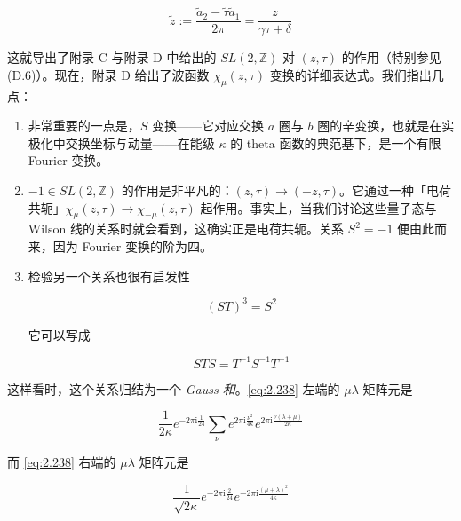 \begin{equation}
  \tilde z:=\frac{\tilde a_2-\tilde\tau\tilde a_1}{2\pi}=\frac{z}{\gamma\tau+\delta}
  \tag{2.236}
  \label{eq:2.236}
\end{equation}

这就导出了附录 C 与附录 D 中给出的 $SL(2,\mathbb{Z})$ 对 $(z,\tau)$ 的作用（特别参见 (D.6)）。现在，附录 D 给出了波函数 $\chi_\mu(z,\tau)$ 变换的详细表达式。我们指出几点：

\begin{enumerate}
  \item 非常重要的一点是，$S$ 变换——它对应交换 $a$ 圈与 $b$ 圈的辛变换，也就是在实极化中交换坐标与动量——在能级 $\kappa$ 的 theta 函数的典范基下，是一个有限 Fourier 变换。

  \item $-1\in SL(2,\mathbb{Z})$ 的作用是非平凡的：$(z,\tau)\to(-z,\tau)$。它通过一种「电荷共轭」$\chi_\mu(z,\tau)\to\chi_{-\mu}(z,\tau)$ 起作用。事实上，当我们讨论这些量子态与 Wilson 线的关系时就会看到，这确实正是电荷共轭。关系 $S^2=-1$ 便由此而来，因为 Fourier 变换的阶为四。

  \item 检验另一个关系也很有启发性

  \begin{equation}
    (ST)^3=S^2
    \tag{2.237}
    \label{eq:2.237}
  \end{equation}

  它可以写成

  \begin{equation}
    STS=T^{-1}S^{-1}T^{-1}
    \tag{2.238}
    \label{eq:2.238}
  \end{equation}
\end{enumerate}

这样看时，这个关系归结为一个 \emph{Gauss 和}。\eqref{eq:2.238} 左端的 $\mu\lambda$ 矩阵元是

\begin{equation}
  \frac{1}{2\kappa}e^{-2\pi\mathrm{i}\frac{1}{24}}\sum_\nu e^{2\pi\mathrm{i}\frac{\nu^2}{4\kappa}}e^{2\pi\mathrm{i}\frac{\nu(\lambda+\mu)}{2\kappa}}
  \tag{2.239}
  \label{eq:2.239}
\end{equation}

而 \eqref{eq:2.238} 右端的 $\mu\lambda$ 矩阵元是

\begin{equation}
  \frac{1}{\sqrt{2\kappa}}e^{-2\pi\mathrm{i}\frac{2}{24}}e^{-2\pi\mathrm{i}\frac{(\mu+\lambda)^2}{4\kappa}}
  \tag{2.240}
  \label{eq:2.240}
\end{equation}

